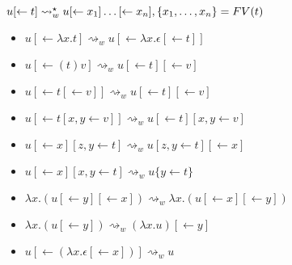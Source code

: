 \documentclass[a4paper]{article}
\begin{document}
$u[\leftarrow t] \rightsquigarrow_w^\star u[\leftarrow x_1]\dots[\leftarrow x_n], \{x_1,\dots,x_n\}=\mathop{FV}(t)$
\begin{itemize}
 \item $u[\leftarrow \lambda x.t] \rightsquigarrow_w u[\leftarrow \lambda x.\epsilon[\leftarrow t]]$
 \item $u[\leftarrow (t)v] \rightsquigarrow_w u[\leftarrow t][\leftarrow v]$
 \item $u[\leftarrow t[\leftarrow v]] \rightsquigarrow_w u[\leftarrow t][\leftarrow v]$
 \item $u[\leftarrow t[x,y\leftarrow v]] \rightsquigarrow_w u[\leftarrow t][x,y\leftarrow v]$
 \item $u[\leftarrow x][z,y\leftarrow t] \rightsquigarrow_w u[z,y\leftarrow t][\leftarrow x]$
 \item $u[\leftarrow x][x,y\leftarrow t] \rightsquigarrow_w u\{y\leftarrow t\}$
 \item $\lambda x.(u[\leftarrow y][\leftarrow x]) \rightsquigarrow_w \lambda x.(u[\leftarrow x][\leftarrow y])$
 \item $\lambda x.(u[\leftarrow y]) \rightsquigarrow_w (\lambda x.u)[\leftarrow y]$
 \item $u[\leftarrow (\lambda x.\epsilon[\leftarrow x])] \rightsquigarrow_w u$
\end{itemize}
\end{document}
